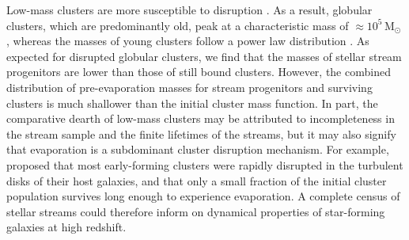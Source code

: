 \documentclass[twocolumn]{aastex63}
\newcommand{\msun}{\ensuremath{\textrm{M}_\odot}}
\begin{document}
Low-mass clusters are more susceptible to disruption \citep[e.g.,][]{fall:2001,kruijssen15b}.
As a result, globular clusters, which are predominantly old, peak at a characteristic mass of $\approx10^5\,\msun$ \citep[e.g.,][]{harris:1991}, whereas the masses of young clusters follow a power law distribution \citep[e.g.,][]{zhang:1999}.
As expected for disrupted globular clusters, we find that the masses of stellar stream progenitors are lower than those of still bound clusters.
However, the combined distribution of pre-evaporation masses for stream progenitors and surviving clusters is much shallower than the initial cluster mass function.
In part, the comparative dearth of low-mass clusters may be attributed to incompleteness in the stream sample and the finite lifetimes of the streams, but it may also signify that evaporation is a subdominant cluster disruption mechanism.
For example, \citet{kruijssen15b} proposed that most early-forming clusters were rapidly disrupted in the turbulent disks of their host galaxies, and that only a small fraction of the initial cluster population survives long enough to experience evaporation.
A complete census of stellar streams could therefore inform on dynamical properties of star-forming galaxies at high redshift.
\end{document}
